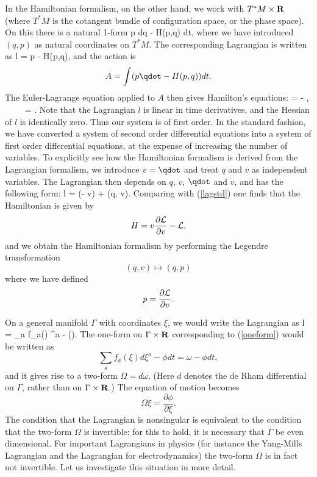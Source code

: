 In the Hamiltonian formalism, on the other hand, we work with 
$T^* M \times {{\bf R }}$ (where 
 $T^* M$  is the   cotangent bundle of configuration space, or the 
 phase space).
On this there is a natural 1-form 
\beq \label{oneform} p dq - H(p,q) dt, \eeq
 where we 
have introduced $(q, p )$ as  natural  coordinates on $T^* M$. 
The corresponding Lagrangian is written as 
\beq \label{lagstd} l = p \qdot - H(p,q), \eeq
and the action is 
$$ A = \int  (p \qdot - H(p,q)) dt. $$
The Euler-Lagrange equation applied to $A$  then gives Hamilton's 
equations:
\beq {} = - , 
~~~~ = . \eeq
Note that 
 the Lagrangian $l$ is linear  in time derivatives, and the Hessian 
of $l$ is identically zero. Thus our system is of first order.
In the standard fashion, we have converted a system of second order 
differential equations into a system of first order differential 
equations, at the expense of increasing the number of variables.
To explicitly see how the Hamiltonian formalism
is derived from the Lagrangian formalism, we introduce 
$v = \qdot$ and treat $q$ and $v$ as independent variables. 
The Lagrangian then depends on $q$, $v$, 
$\qdot$ and $\dot{v}$, and has the following form: 
\beq l =  (\qdot - v) + \calL(q, v). \eeq
Comparing with (\ref{lagstd})
one finds that the Hamiltonian   is given by 
$$ H = v \frac{\partial {\mbox{$\cal L$}}}{\partial v} - {\mbox{$\cal L$}}, $$
and we obtain the Hamiltonian formalism by performing the Legendre 
transformation 
$$ (q, v) \mapsto (q,p) $$
where we have defined 
$$ p = \frac{\partial {\mbox{$\cal L$}}}{\partial v}. $$


On a general manifold $\Gamma$ with coordinates $\xi$, we would 
write the Lagrangian as 
\beq l = \sum_a f_a(\xi) \dot{\xi}^a - \phi(\xi). \eeq
The one-form on $\Gamma \times {{\bf R }}$ corresponding to (\ref{oneform}) 
would be written as 
$$  \sum_a f_a(\xi) d \xi^a  - \phi dt = \omega - 
\phi dt, $$
and it gives rise to a two-form $ \Omega = d \omega$. (Here $d$ denotes
the de Rham differential on $\Gamma$, rather than   on $\Gamma \times {{\bf R }}$.) 
The equation of motion becomes 
$$ \Omega \dot{\xi} = \frac{\partial \phi}{\partial \xi}. $$
The condition that the Lagrangian is nonsingular is equivalent to the 
condition that the 
two-form $\Omega$ is invertible: for this to hold, it is 
necessary that $\Gamma$ be even dimensional.    For   important Lagrangians
in physics (for instance the Yang-Mills Lagrangian and the 
Lagrangian for electrodynamics) the two-form $\Omega$ is in fact not
invertible. Let us investigate this situation in more detail.

